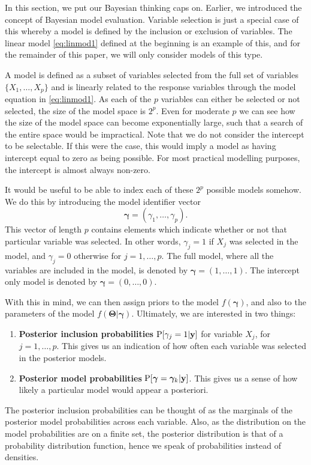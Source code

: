 In this section, we put our Bayesian thinking caps on. Earlier, we introduced the concept of Bayesian model evaluation. Variable selection is just a special case of this whereby a model is defined by the inclusion or exclusion of variables. The linear model \eqref{eq:linmod1} defined at the beginning is an example of this, and for the remainder of this paper, we will only consider models of this type. 

A model is defined as a subset of variables selected from the full set of variables $\{X_1, \dots, X_p \}$ and is linearly related to the response variables through the model equation in \eqref{eq:linmod1}. As each of the $p$ variables can either be selected or not selected, the size of the model space is $2^p$. Even for moderate $p$ we can see how the size of the model space can become exponentially large, such that a search of the entire space would be impractical. Note that we do not consider the intercept to be selectable. If this were the case, this would imply a model as having intercept equal to zero as being possible. For most practical modelling purposes, the intercept is almost always non-zero.

It would be useful to be able to index each of these $2^p$ possible models somehow. We do this by introducing the model identifier vector
\[
	\boldsymbol\gamma = (\gamma_1, \dots, \gamma_p).
\]
This vector of length $p$ contains elements which indicate whether or not that particular variable was selected. In other words, $\gamma_j = 1$ if $X_j$ was selected in the model, and $\gamma_j = 0$ otherwise for $j=1,\dots,p$. The full model, where all the variables are included in the model, is denoted by $\boldsymbol\gamma = (1, \dots, 1)$. The intercept only model is denoted by $\boldsymbol\gamma = (0, \dots, 0)$.

With this in mind, we can then assign priors to the model $f(\boldsymbol\gamma)$, and also to the parameters of the model $f(\boldsymbol\Theta|\boldsymbol\gamma)$. Ultimately, we are interested in two things:
\begin{enumerate}
	\item \textbf{Posterior inclusion probabilities} $\operatorname{P}[\gamma_j=1|\mathbf y]$ for variable $X_j$, for $j=1,\dots,p$. This gives us an indication of how often each variable was selected in the posterior models.
	\item \textbf{Posterior model probabilities} $\operatorname{P}[\boldsymbol \gamma=\boldsymbol \gamma_k|\mathbf y]$. This gives us a sense of how likely a particular model would appear a posteriori.
\end{enumerate}
The posterior inclusion probabilities can be thought of as the marginals of the posterior model probabilities across each variable. Also, as the distribution on the model probabilities are on a finite set, the posterior distribution is that of a probability distribution function, hence we speak of probabilities instead of densities.

